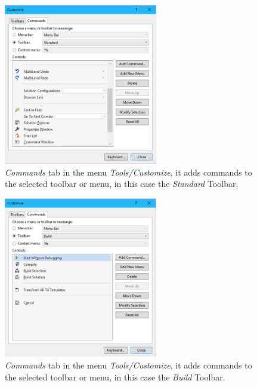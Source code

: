 \begin{figure}[h]
    \centering
    \includegraphics[width= 0.6\textwidth]{Figures/Config4-2}
    \caption{\textit{Commands} tab in the menu \textit{Tools/Customize}, it adds commands to the selected toolbar or menu, in this case the \textit{Standard} Toolbar.}
    \label{fig:Config4-2}
\end{figure}

\begin{figure}[h]
    \centering
    \includegraphics[width= 0.6\textwidth]{Figures/Config4}
    \caption{\textit{Commands} tab in the menu \textit{Tools/Customize}, it adds commands to the selected toolbar or menu, in this case the \textit{Build} Toolbar.}
    \label{fig:Config4}
\end{figure}

